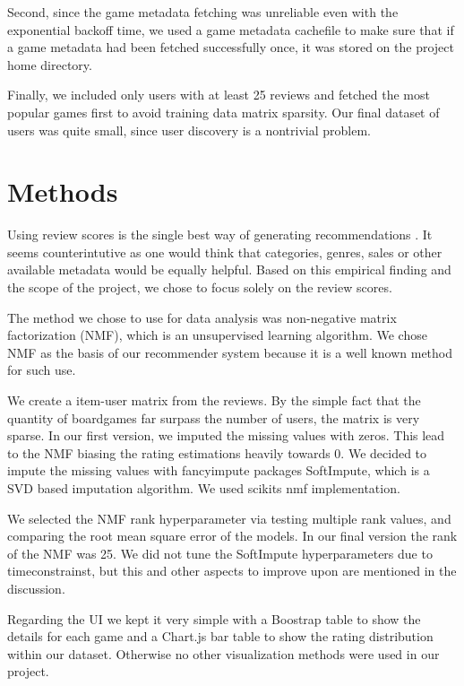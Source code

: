 \documentclass[a4paper,12pt,bibliography=totoc,numbers=noenddot,sfdefaults=false,abstract=true,notitlepage]{scrartcl} %
\begin{document}
	Second, since the game metadata fetching was unreliable even with the exponential backoff time, we used a game metadata cachefile to make sure that if a game metadata had been fetched successfully once, it was stored  on the project home directory.

	Finally, we included only users with at least 25 reviews and fetched the most popular games first to avoid training data matrix sparsity. Our final dataset of users was quite small, since user discovery is a nontrivial problem.
	
	
	\section{Methods}\label{methods}

	Using review scores is the single best way of generating recommendations \autocite{epsteinRangeWhyGeneralists2021}. It seems counterintutive as one would think that categories, genres, sales or other available metadata would be equally helpful. Based on this empirical finding and the scope of the project, we chose to focus solely on the review scores.

	The method we chose to use for data analysis was non-negative matrix factorization (NMF), which is an unsupervised learning algorithm. We chose NMF as the basis of our recommender system
    because it is a well known method for such use. %

    We create a item-user matrix from the reviews. By the simple fact that the quantity of boardgames far surpass the number of users, the matrix is very sparse. In our
    first version, we imputed the missing values with zeros. This lead to the NMF biasing the rating estimations heavily towards 0. We decided to impute the missing values
    with fancyimpute packages SoftImpute, which is a SVD based imputation algorithm.%
    We used scikits nmf implementation.

    We selected the NMF rank hyperparameter via testing multiple rank values, and comparing the root mean square error of the models. In our final version the rank of the NMF
    was 25. We did not tune the SoftImpute hyperparameters due to timeconstrainst, but this and other aspects to improve upon are mentioned in the discussion.

	Regarding the UI we kept it very simple with a Boostrap table to show the details for each game and a Chart.js bar table to show the rating distribution within our dataset. Otherwise no other visualization methods were used in our project.
	
\end{document}
